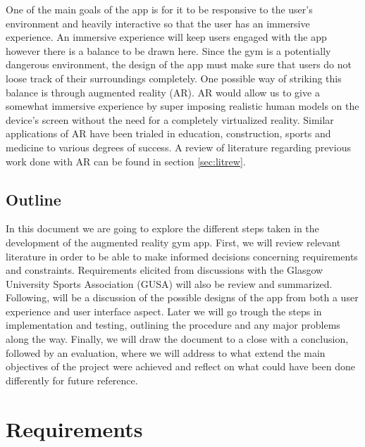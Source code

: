 \documentclass{l4proj}
\begin{document}
One of the main goals of the app is for it to be responsive to the user's environment and heavily interactive so that the user has an immersive experience. An immersive experience will keep users engaged with the app however there is a balance to be drawn here. Since the gym is a potentially dangerous environment, the design of the app must make sure that users do not loose track of their surroundings completely. One possible way of striking this balance is through augmented reality (AR). AR would allow us to give a somewhat immersive experience by super imposing realistic human models on the device's screen without the need for a completely virtualized reality. Similar applications of AR have been trialed in education, construction, sports and medicine to various degrees of success. A review of literature regarding previous work done with AR can be found in section \ref{sec:litrew}.

\section{Outline}
In this document we are going to explore the different steps taken in the development of the augmented reality gym app. First, we will review relevant literature in order to be able to make informed decisions concerning requirements and constraints. Requirements elicited from discussions with the Glasgow University Sports Association (GUSA) will also be review and summarized. Following, will be a discussion of the possible designs of the app from both a user experience and user interface aspect. Later we will go trough the steps in implementation and testing, outlining the procedure and any major problems along the way. Finally, we will draw the document to a close with a conclusion, followed by an evaluation, where we will address to what extend the main objectives of the project were achieved and reflect on what could have been done differently for future reference. 

\chapter{Requirements}
\end{document}
